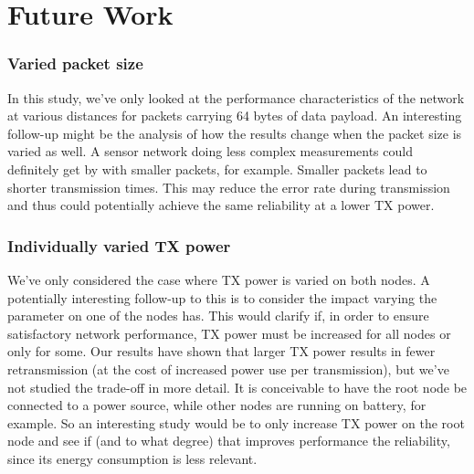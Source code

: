 \documentclass[conference]{IEEEtran}
\renewcommand\_{\textunderscore\allowbreak}
\begin{document}
\section{Future Work}
\label{section:futurework}

\subsubsection{Varied packet size}
In this study, we've only looked at the performance characteristics of the network at various distances for packets carrying 64 bytes of data payload. An interesting follow-up might be the analysis of how the results change when the packet size is varied as well. A sensor network doing less complex measurements could definitely get by with smaller packets, for example. Smaller packets lead to shorter transmission times. This may reduce the error rate during transmission and thus could potentially achieve the same reliability at a lower TX power. 

\subsubsection{Individually varied TX power}
We've only considered the case where TX power is varied on both nodes. A potentially interesting follow-up to this is to consider the impact varying the parameter on one of the nodes has. This would clarify if, in order to ensure satisfactory network performance, TX power must be increased for all nodes or only for some. Our results have shown that larger TX power results in fewer retransmission (at the cost of increased power use per transmission\cite{AccurateEnergyTSCH}), but we've not studied the trade-off in more detail. It is conceivable to have the root node be connected to a power source, while other nodes are running on battery, for example. So an interesting study would be to only increase TX power on the root node and see if (and to what degree) that improves performance the reliability, since its energy consumption is less relevant. 
\end{document}
